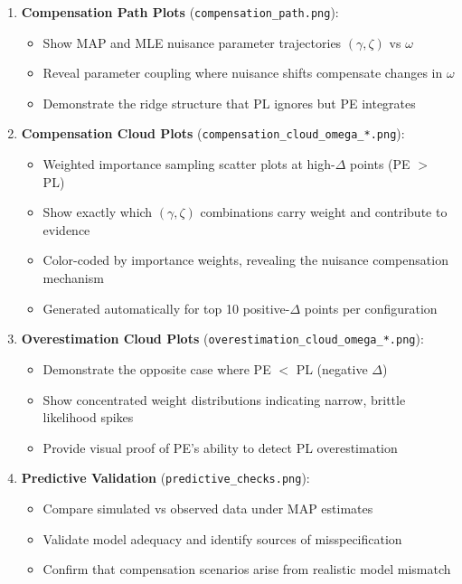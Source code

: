 \documentclass[conference]{IEEEtran}
\begin{document}
\begin{enumerate}
\item \textbf{Compensation Path Plots} (\texttt{compensation\_path.png}): 
   \begin{itemize}
   \item Show MAP and MLE nuisance parameter trajectories $(\gamma, \zeta)$ vs $\omega$
   \item Reveal parameter coupling where nuisance shifts compensate changes in $\omega$
   \item Demonstrate the ridge structure that PL ignores but PE integrates
   \end{itemize}

\item \textbf{Compensation Cloud Plots} (\texttt{compensation\_cloud\_omega\_*.png}):
   \begin{itemize}
   \item Weighted importance sampling scatter plots at high-$\Delta$ points (PE $>$ PL)
   \item Show exactly which $(\gamma, \zeta)$ combinations carry weight and contribute to evidence
   \item Color-coded by importance weights, revealing the nuisance compensation mechanism
   \item Generated automatically for top 10 positive-$\Delta$ points per configuration
   \end{itemize}

\item \textbf{Overestimation Cloud Plots} (\texttt{overestimation\_cloud\_omega\_*.png}):
   \begin{itemize}
   \item Demonstrate the opposite case where PE $<$ PL (negative $\Delta$)
   \item Show concentrated weight distributions indicating narrow, brittle likelihood spikes
   \item Provide visual proof of PE's ability to detect PL overestimation
   \end{itemize}

\item \textbf{Predictive Validation} (\texttt{predictive\_checks.png}):
   \begin{itemize}
   \item Compare simulated vs observed data under MAP estimates
   \item Validate model adequacy and identify sources of misspecification
   \item Confirm that compensation scenarios arise from realistic model mismatch
   \end{itemize}
\end{enumerate}
\end{document}
